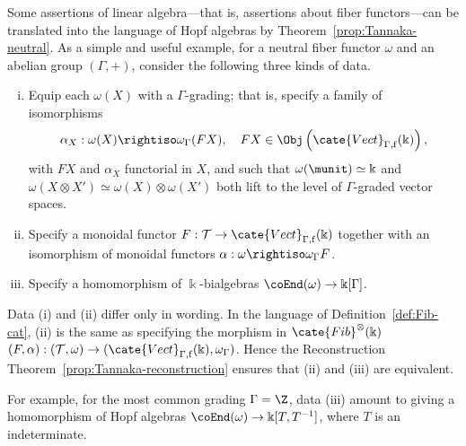 \begin{remark}
	Some assertions of linear algebra---that is, assertions about fiber
	functors---can be translated into the language of Hopf algebras by
	Theorem~\ref{prop:Tannaka-neutral}. As a simple and useful example, for a
	neutral fiber functor $\omega$ and an abelian group $(\Gamma,+)$,
	consider the following three kinds of data.
	\begin{enumerate}[(i)]
		\item Equip each $\omega(X)$ with a $\Gamma$-grading; that is, specify
		a family of isomorphisms
		\[ \alpha_X: \omega(X) \rightiso \omega_\Gamma(FX), \quad FX \in \Obj\left( \cate{Vect}_{\Gamma, \mathrm{f}}(\Bbbk) \right), \]
		with $FX$ and $\alpha_X$ functorial in $X$, and such that
		$\omega(\munit)\simeq\Bbbk$ and
		$\omega(X\otimes X')\simeq\omega(X)\otimes\omega(X')$ both lift to
		the level of $\Gamma$-graded vector spaces.
		\item Specify a monoidal functor
		$F:\mathcal{T}\to\cate{Vect}_{\Gamma,\mathrm f}(\Bbbk)$ together with
		an isomorphism of monoidal functors
		$\alpha:\omega\rightiso\omega_\Gamma F$.
		\item Specify a homomorphism of $\Bbbk$-bialgebras
		$\coEnd(\omega)\to\Bbbk[\Gamma]$.
	\end{enumerate}

	Data (i) and (ii) differ only in wording. In the language of
	Definition~\ref{def:Fib-cat}, (ii) is the same as specifying the morphism
	in $\cate{Fib}^{\otimes}(\Bbbk)$
	$(F,\alpha):(\mathcal{T},\omega)\to
	(\cate{Vect}_{\Gamma,\mathrm f}(\Bbbk),\omega_\Gamma)$. Hence the
	Reconstruction Theorem~\ref{prop:Tannaka-reconstruction} ensures that
	(ii) and (iii) are equivalent.

	For example, for the most common grading $\Gamma=\Z$, data (iii) amount
	to giving a homomorphism of Hopf algebras
	$\coEnd(\omega)\to\Bbbk[T,T^{-1}]$, where $T$ is an indeterminate.
\end{remark}
